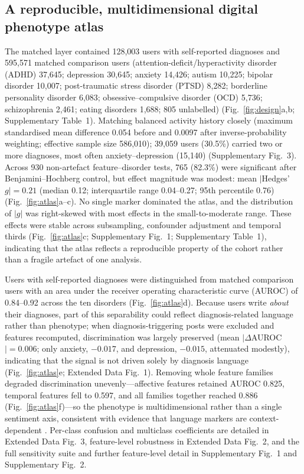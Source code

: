 \documentclass[11pt]{article}
\newcommand{\supfig}[1]{Supplementary Fig.~#1}
\newcommand{\suptab}[1]{Supplementary Table~#1}
\newcommand{\edfig}[1]{Extended Data Fig.~#1}
\begin{document}
\subsection*{A reproducible, multidimensional digital phenotype atlas}
The matched layer contained 128{,}003 users with self-reported diagnoses and 595{,}571 matched comparison users
(attention-deficit/hyperactivity disorder (ADHD) 37{,}645; depression 30{,}645; anxiety 14{,}426; autism 10{,}225; bipolar disorder 10{,}007; post-traumatic stress disorder (PTSD)
8{,}282; borderline personality disorder 6{,}083; obsessive--compulsive disorder (OCD) 5{,}736; schizophrenia 2{,}461; eating disorders
1{,}688; 805 unlabelled) (Fig.~\ref{fig:design}a,b; \suptab{1}). Matching balanced activity
history closely (maximum standardised mean difference 0.054 before and 0.0097 after
inverse-probability weighting; effective sample size 586{,}010); 39{,}059 users (30.5\%)
carried two or more diagnoses, most often anxiety--depression (15{,}140)
(\supfig{3}). Across 930 non-artefact feature--disorder tests, 765 (82.3\%) were significant
after Benjamini--Hochberg control, but effect magnitude was modest: mean $|$Hedges'
$g|=0.21$ (median 0.12; interquartile range 0.04--0.27; 95th percentile 0.76)
(Fig.~\ref{fig:atlas}a--c). No single marker dominated the atlas, and the
distribution of $|g|$ was right-skewed with most effects in the small-to-moderate range. These effects were stable across subsampling, confounder adjustment
and temporal thirds (Fig.~\ref{fig:atlas}c; \supfig{1}; \suptab{1}), indicating that the
atlas reflects a reproducible property of the cohort rather than a fragile artefact of one
analysis.

Users with self-reported diagnoses were distinguished from matched comparison users with an area under the
receiver operating characteristic curve (AUROC) of 0.84--0.92 across the ten disorders
(Fig.~\ref{fig:atlas}d). Because users write \emph{about} their diagnoses, part of this
separability could reflect diagnosis-related language rather than phenotype; when
diagnosis-triggering posts were excluded and features recomputed, discrimination was largely
preserved (mean $|\Delta$AUROC$|=0.006$; only anxiety, $-0.017$, and depression, $-0.015$,
attenuated modestly), indicating that the signal is not driven solely by diagnosis language
(Fig.~\ref{fig:atlas}e; \edfig{1}). Removing whole feature families degraded discrimination
unevenly---affective features retained AUROC 0.825, temporal features fell to 0.597, and all
families together reached 0.886 (Fig.~\ref{fig:atlas}f)---so the phenotype is
multidimensional rather than a single sentiment axis, consistent with evidence that language
markers are context-dependent \cite{rai2024race}. Per-class confusion and multiclass
coefficients are detailed in \edfig{3}, feature-level robustness in \edfig{2}, and the full
sensitivity suite and further feature-level detail in \supfig{1} and \supfig{2}.
\end{document}
